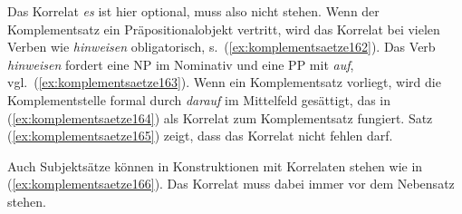 \Stretch[0.25]

\begin{exe}
  \ex\label{ex:komplementsaetze158}
  \begin{xlist}
  \end{xlist}
\end{exe}

\Stretch[0.25]

Das Korrelat \textit{es} ist hier optional, muss also nicht stehen.
Wenn der Komplementsatz ein Präpositionalobjekt vertritt, wird das Korrelat bei vielen Verben wie \textit{hinweisen} obligatorisch, s.\ (\ref{ex:komplementsaetze162}).
Das Verb \textit{hinweisen} fordert eine NP im Nominativ und eine PP mit \textit{auf}, vgl.\ (\ref{ex:komplementsaetze163}).
Wenn ein Komplementsatz vorliegt, wird die Komplementstelle formal durch \textit{darauf} im Mittelfeld gesättigt, das in (\ref{ex:komplementsaetze164}) als Korrelat zum Komplementsatz fungiert.
Satz (\ref{ex:komplementsaetze165}) zeigt, dass das Korrelat nicht fehlen darf.

\Stretch[0.25]

\begin{exe}
  \ex\label{ex:komplementsaetze162}
  \begin{xlist}
  \end{xlist}
\end{exe}

\Np

Auch Subjektsätze können in Konstruktionen mit Korrelaten stehen wie in (\ref{ex:komplementsaetze166}).
Das Korrelat muss dabei immer vor dem Nebensatz stehen.

\begin{exe}
  \ex\label{ex:komplementsaetze166}
  \begin{xlist}
  \end{xlist}
\end{exe}


